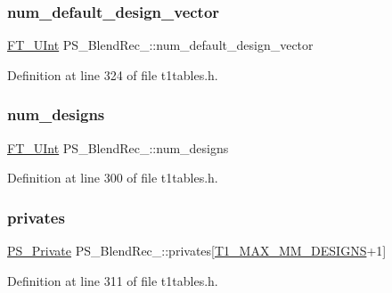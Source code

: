\subsubsection{\texorpdfstring{num\_default\_design\_vector}{num\_default\_design\_vector}}
{\footnotesize\ttfamily \mbox{\hyperlink{fttypes_8h_abcb8db4dbf35d2b55a9e8c7b0926dc52}{F\+T\+\_\+\+U\+Int}} P\+S\+\_\+\+Blend\+Rec\+\_\+\+::num\+\_\+default\+\_\+design\+\_\+vector}



Definition at line 324 of file t1tables.\+h.

\mbox{\label{struct_p_s___blend_rec___ad81cbf3697f89908e9c15071e2ab9cac}} 
\subsubsection{\texorpdfstring{num\_designs}{num\_designs}}
{\footnotesize\ttfamily \mbox{\hyperlink{fttypes_8h_abcb8db4dbf35d2b55a9e8c7b0926dc52}{F\+T\+\_\+\+U\+Int}} P\+S\+\_\+\+Blend\+Rec\+\_\+\+::num\+\_\+designs}



Definition at line 300 of file t1tables.\+h.

\mbox{\label{struct_p_s___blend_rec___a2b6e0c48d7a9c350b09f2943c1779ea4}} 
\subsubsection{\texorpdfstring{privates}{privates}}
{\footnotesize\ttfamily \mbox{\hyperlink{t1tables_8h_af13eae0f58324d685b24cd4079c01c7e}{P\+S\+\_\+\+Private}} P\+S\+\_\+\+Blend\+Rec\+\_\+\+::privates\mbox{[}\mbox{\hyperlink{t1tables_8h_a933ca229674aa312fd5546fadc95e08f}{T1\+\_\+\+M\+A\+X\+\_\+\+M\+M\+\_\+\+D\+E\+S\+I\+G\+NS}}+1\mbox{]}}



Definition at line 311 of file t1tables.\+h.

\mbox{\label{struct_p_s___blend_rec___ae3dcbb2aaee676fdc3d5bde890b2cc78}} 

